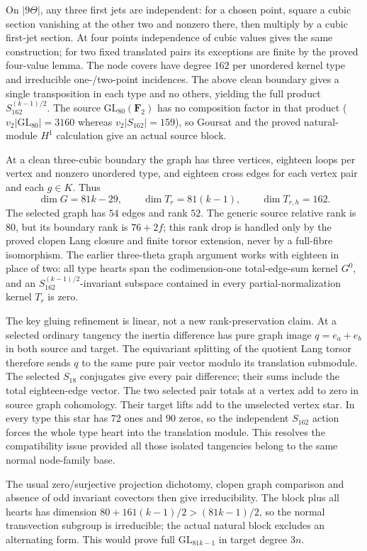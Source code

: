 On $|9\Theta|$, any three first jets are independent: for a chosen
point, square a cubic section vanishing at the other two and
nonzero there, then multiply by a cubic first-jet section. At four
points independence of cubic values gives the same construction;
for two fixed translated pairs its exceptions are finite by the
proved four-value lemma. The node covers have degree $162$ per
unordered kernel type and irreducible one-/two-point incidences.
The above clean boundary gives a single transposition in each
type and no others, yielding the full product $S_{162}^{(k-1)/2}$.
The source $\mathrm{GL}_{80}(\mathbf F_2)$ has no composition factor
in that product ($v_2|\mathrm{GL}_{80}|=3160$ whereas
$v_2|S_{162}|=159$), so Goursat and the proved natural-module
$H^1$ calculation give an actual source block.

At a clean three-cubic boundary the graph has three vertices,
eighteen loops per vertex and nonzero unordered type, and eighteen
cross edges for each vertex pair and each $g\in K$. Thus
\[
 \dim G=81k-29,\qquad
 \dim T_r=81(k-1),\qquad \dim T_{r,h}=162.
\]
The selected graph has $54$ edges and rank $52$.
The generic source relative rank is $80$, but its boundary rank is
$76+2f$; this rank drop is handled only by the proved clopen Lang
closure and finite torsor extension, never by a full-fibre isomorphism.
The earlier three-theta graph argument works with eighteen in place
of two: all type hearts span the codimension-one total-edge-sum
kernel $G^0$, and an $S_{162}^{(k-1)/2}$-invariant subspace contained
in every partial-normalization kernel $T_r$ is zero.

The key gluing refinement is linear, not a new rank-preservation
claim. At a selected ordinary tangency the inertia difference has
pure graph image $q=e_a+e_b$ in both source and target. The
equivariant splitting of the quotient Lang torsor therefore sends
$q$ to the same pure pair vector modulo its translation submodule.
The selected $S_{18}$ conjugates give every pair difference;
their sums include the total eighteen-edge vector. The two selected
pair totals at a vertex add to zero in source graph cohomology.
Their target lifts add to the unselected vertex star. In every
type this star has $72$ ones and $90$ zeros, so the independent
$S_{162}$ action forces the whole type heart into the translation
module. This resolves the compatibility issue provided all those
isolated tangencies belong to the same normal node-family base.

The usual zero/surjective projection dichotomy, clopen graph
comparison and absence of odd invariant covectors then give
irreducibility. The block plus all hearts has dimension
$80+161(k-1)/2>(81k-1)/2$, so the normal transvection subgroup is
irreducible; the actual natural block excludes an alternating form.
This would prove full $\mathrm{GL}_{81k-1}$ in target degree $3n$.

